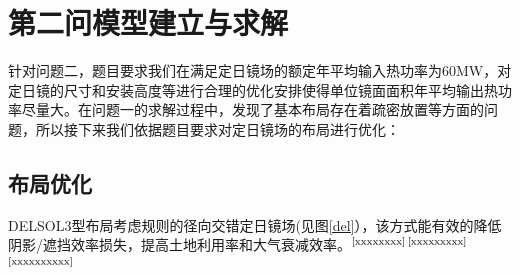 \documentclass[withoutpreface,bwprint]{cumcmthesis} %
\begin{document}
\section{第二问模型建立与求解}
针对问题二，题目要求我们在满足定日镜场的额定年平均输入热功率为60MW，对定日镜的尺寸和安装高度等进行合理的优化安排使得单位镜面面积年平均输出热功率尽量大。在问题一的求解过程中，发现了基本布局存在着疏密放置等方面的问题，所以接下来我们依据题目要求对定日镜场的布局进行优化：
\subsection{布局优化}
DELSOL3型布局考虑规则的径向交错定日镜场(见图\ref{del}），该方式能有效的降低阴影/遮挡效率损失，提高土地利用率和大气衰减效率。$^\text{\cite{xxxxxxxx}}$$^\text{\cite{xxxxxxxxx}}$$^\text{\cite{xxxxxxxxxx}}$
\begin{figure}[H]
\begin{center}


\begin{tikzpicture}[x=0.75pt,y=0.75pt,yscale=-1,xscale=1]


\end{tikzpicture}
\end{center}
\end{figure}
\end{document}
